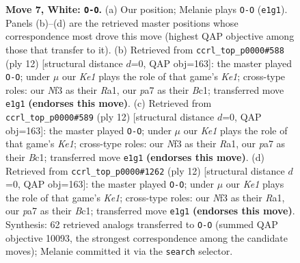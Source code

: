 \documentclass[11pt]{article}
\begin{document}
\begin{figure}[p]
\caption{\textbf{Move 7, White: \texttt{O-O}.} (a) Our position; Melanie plays \texttt{O-O} (\texttt{e1g1}). Panels (b)--(d) are the retrieved master positions whose correspondence most drove this move (highest QAP objective among those that transfer to it). (b) Retrieved from \texttt{ccrl\_top\_p0000\#588} (ply 12) [structural distance $d$=0, QAP obj=163]: the master played \texttt{O-O}; under $\mu$ our \emph{Ke1} plays the role of that game's \emph{Ke1}; cross-type roles: our \emph{N}f3 as their \emph{R}a1, our \emph{p}a7 as their \emph{B}c1; transferred move \texttt{e1g1} \textbf{(endorses this move)}. (c) Retrieved from \texttt{ccrl\_top\_p0000\#589} (ply 12) [structural distance $d$=0, QAP obj=163]: the master played \texttt{O-O}; under $\mu$ our \emph{Ke1} plays the role of that game's \emph{Ke1}; cross-type roles: our \emph{N}f3 as their \emph{R}a1, our \emph{p}a7 as their \emph{B}c1; transferred move \texttt{e1g1} \textbf{(endorses this move)}. (d) Retrieved from \texttt{ccrl\_top\_p0000\#1262} (ply 12) [structural distance $d$=0, QAP obj=163]: the master played \texttt{O-O}; under $\mu$ our \emph{Ke1} plays the role of that game's \emph{Ke1}; cross-type roles: our \emph{N}f3 as their \emph{R}a1, our \emph{p}a7 as their \emph{B}c1; transferred move \texttt{e1g1} \textbf{(endorses this move)}. Synthesis: 62 retrieved analogs transferred to \texttt{O-O} (summed QAP objective 10093, the strongest correspondence among the candidate moves); Melanie committed it via the \texttt{search} selector.}
\label{fig:thought-m12}
\end{figure}

\clearpage
\end{document}
